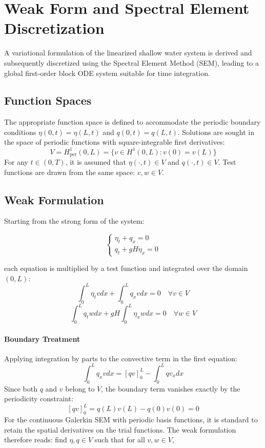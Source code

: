 
\section{Weak Form and Spectral Element Discretization}
\label{sc:23}

A variational formulation of the linearized shallow water system is derived and subsequently discretized using the Spectral Element Method (SEM), leading to a global first-order block ODE system suitable for time integration.

\subsection{Function Spaces}

The appropriate function space is defined to accommodate the periodic boundary conditions \(\eta(0,t) = \eta(L,t)\) and \(q(0,t) = q(L,t)\). Solutions are sought in the space of periodic functions with square-integrable first derivatives:
\[
V = H^1_{\mathrm{per}}(0,L) = \{ v \in H^1(0,L) : v(0) = v(L) \}
\]
For any \(t \in (0,T)\), it is assumed that \(\eta(\cdot,t) \in V\) and \(q(\cdot,t) \in V\). Test functions are drawn from the same space: \(v, w \in V\).

\subsection{Weak Formulation}

Starting from the strong form of the system:

\begin{equation}
\begin{cases}
\eta_{t} + q_{x} = 0 \\
q_{t} + gH\eta_{x} = 0
\end{cases}
\label{eq:strong_form_3}
\end{equation}

each equation is multiplied by a test function and integrated over the domain \((0,L)\):
\[
\int_{0}^{L} \eta_{t} v dx + \int_{0}^{L} q_{x} v dx = 0 \quad \forall v \in V
\]
\[
\int_{0}^{L} q_{t} w dx + gH \int_{0}^{L} \eta_{x} w dx = 0 \quad \forall w \in V
\]

\paragraph{Boundary Treatment} Applying integration by parts to the convective term in the first equation:
\[
\int_{0}^{L} q_{x} v dx = [qv]_{0}^{L} - \int_{0}^{L} q v_{x} dx
\]
Since both \(q\) and \(v\) belong to \(V\), the boundary term vanishes exactly by the periodicity constraint:
\[
[qv]_{0}^{L} = q(L)v(L) - q(0)v(0) = 0
\]
For the continuous Galerkin SEM with periodic basis functions, it is standard to retain the spatial derivatives on the trial functions. The weak formulation therefore reads: find \(\eta, q \in V\) such that for all \(v, w \in V\),

